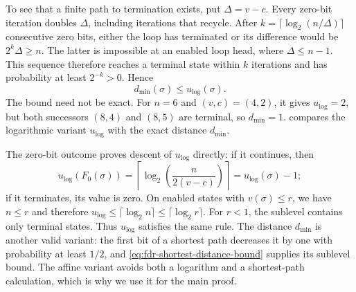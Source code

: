 To see that a finite path to termination exists, put $\Delta=v-c$.
Every zero-bit iteration doubles $\Delta$, including iterations that
recycle. After
$k=\lceil\log_2(n/\Delta)\rceil$ consecutive zero bits, either the loop
has terminated or its difference would be $2^k\Delta\geq n$.
The latter is impossible at an enabled loop head, where
$\Delta\leq n-1$. This sequence therefore reaches a terminal state
within $k$ iterations and has probability at least $2^{-k}>0$. Hence
\begin{equation}
 d_{\min}(\sigma)\leq u_{\log}(\sigma).
 \label{eq:fdr-shortest-distance-bound}
\end{equation}
The bound need not be exact. For $n=6$ and $(v,c)=(4,2)$, it gives
$u_{\log}=2$, but both successors $(8,4)$ and $(8,5)$ are terminal,
so $d_{\min}=1$.  compares the
logarithmic variant $u_{\log}$ with the exact distance $d_{\min}$.

The zero-bit outcome proves descent of $u_{\log}$ directly: if it
continues, then
\[
 u_{\log}(F_0(\sigma))
 =\left\lceil\log_2\!\left(\frac{n}{2(v-c)}\right)\right\rceil
 =u_{\log}(\sigma)-1;
\]
if it terminates, its value is zero. On enabled states with
$v(\sigma)\leq r$, we have $n\leq r$ and therefore
$u_{\log}\leq\lceil\log_2 n\rceil\leq\lceil\log_2 r\rceil$.
For $r<1$, the sublevel contains only terminal states.
Thus $u_{\log}$ satisfies the same rule.
The distance $d_{\min}$ is another valid variant: the first bit of
a shortest path decreases it by one with probability at least $1/2$,
and \eqref{eq:fdr-shortest-distance-bound} supplies its sublevel bound.
The affine variant avoids both a logarithm and a shortest-path
calculation, which is why we use it for the main proof.

